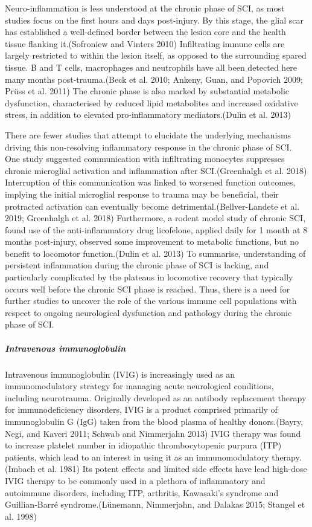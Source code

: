 \documentclass[9pt,lineno]{elife}
\begin{document}
Neuro-inflammation is less understood at the chronic phase of SCI, as most studies focus on the first hours and days post-injury.
By this stage, the glial scar has established a well-defined border between the lesion core and the health tissue flanking it.(Sofroniew and Vinters 2010)
Infiltrating immune cells are largely restricted to within the lesion itself, as opposed to the surrounding spared tissue.
B and T cells, macrophages and neutrophils have all been detected here many months post-trauma.(Beck et al. 2010; Ankeny, Guan, and Popovich 2009; Prüss et al. 2011)
The chronic phase is also marked by substantial metabolic dysfunction, characterised by reduced lipid metabolites and increased oxidative stress, in addition to elevated pro-inflammatory mediators.(Dulin et al. 2013)

There are fewer studies that attempt to elucidate the underlying mechanisms driving this non-resolving inflammatory response in the chronic phase of SCI.
One study suggested communication with infiltrating monocytes suppresses chronic microglial activation and inflammation after SCI.(Greenhalgh et al. 2018)
Interruption of this communication was linked to worsened function outcomes, implying the initial microglial response to trauma may be beneficial, their protracted activation can eventually become detrimental.(Bellver-Landete et al. 2019; Greenhalgh et al. 2018)
Furthermore, a rodent model study of chronic SCI, found use of the anti-inflammatory drug licofelone, applied daily for 1 month at 8 months post-injury, observed some improvement to metabolic functions, but no benefit to locomotor function.(Dulin et al. 2013)
To summarise, understanding of persistent inflammation during the chronic phase of SCI is lacking, and particularly complicated by the plateaus in locomotive recovery that typically occurs well before the chronic SCI phase is reached.
Thus, there is a need for further studies to uncover the role of the various immune cell populations with respect to ongoing neurological dysfunction and pathology during the chronic phase of SCI.

\hypertarget{intravenous-immunoglobulin}{%
\subparagraph{Intravenous immunoglobulin}\label{intravenous-immunoglobulin}}

Intravenous immunoglobulin (IVIG) is increasingly used as an immunomodulatory strategy for managing acute neurological conditions, including neurotrauma.
Originally developed as an antibody replacement therapy for immunodeficiency disorders, IVIG is a product comprised primarily of immunoglobulin G (IgG) taken from the blood plasma of healthy donors.(Bayry, Negi, and Kaveri 2011; Schwab and Nimmerjahn 2013)
IVIG therapy was found to increase platelet number in idiopathic thrombocytopenic purpura (ITP) patients, which lead to an interest in using it as an immunomodulatory therapy.(Imbach et al. 1981)
Its potent effects and limited side effects have lead high-dose IVIG therapy to be commonly used in a plethora of inflammatory and autoimmune disorders, including ITP, arthritis, Kawasaki's syndrome and Guillian-Barré syndrome.(Lünemann, Nimmerjahn, and Dalakas 2015; Stangel et al. 1998)
\end{document}
